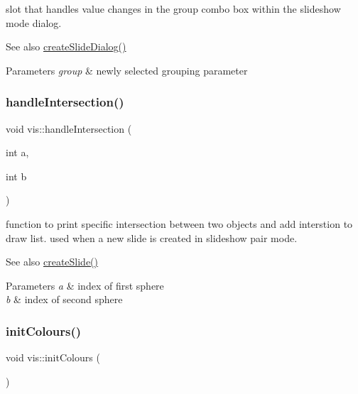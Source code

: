 slot that handles value changes in the group combo box within the slideshow mode dialog.

\begin{DoxySeeAlso}{See also}
\mbox{\hyperlink{classvis_a09be90ab62dec1dcf2a72690d254acfb}{create\+Slide\+Dialog()}} 
\end{DoxySeeAlso}

\begin{DoxyParams}{Parameters}
{\em group} & newly selected grouping parameter \\
\hline
\end{DoxyParams}
\mbox{\label{classvis_a43ad888fa6478686d0cd81daa849ffd8}} 
\subsubsection{\texorpdfstring{handle\+Intersection()}{handleIntersection()}}
{\footnotesize\ttfamily void vis\+::handle\+Intersection (\begin{DoxyParamCaption}\item[{int}]{a,  }\item[{int}]{b }\end{DoxyParamCaption})}

function to print specific intersection between two objects and add interstion to draw list. used when a new slide is created in slideshow pair mode.

\begin{DoxySeeAlso}{See also}
\mbox{\hyperlink{classvis_a131dcf83ee61359b99624ea2538898a4}{create\+Slide()}} 
\end{DoxySeeAlso}

\begin{DoxyParams}{Parameters}
{\em a} & index of first sphere \\
\hline
{\em b} & index of second sphere \\
\hline
\end{DoxyParams}
\mbox{\label{classvis_a3084a34dc367afa2d5d723e7e5a8fe47}} 
\subsubsection{\texorpdfstring{init\+Colours()}{initColours()}}
{\footnotesize\ttfamily void vis\+::init\+Colours (\begin{DoxyParamCaption}{ }\end{DoxyParamCaption})}

